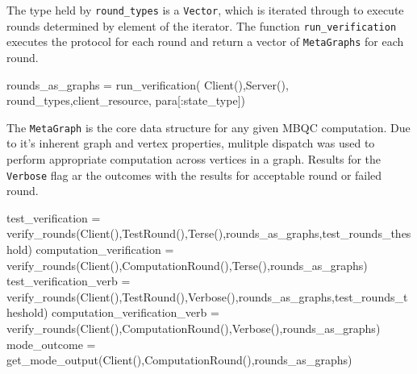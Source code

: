 \documentclass[
]{article}
\newenvironment{Shaded}{}{}
\newcommand{\FunctionTok}[1]{\textcolor[rgb]{0.02,0.16,0.49}{#1}}
\newcommand{\NormalTok}[1]{#1}
\newcommand{\OperatorTok}[1]{\textcolor[rgb]{0.40,0.40,0.40}{#1}}
\begin{document}
The type held by \texttt{round\_types} is a \texttt{Vector}, which is
iterated through to execute rounds determined by element of the
iterator. The function \texttt{run\_verification} executes the protocol
for each round and return a vector of \texttt{MetaGraphs} for each
round.

\begin{Shaded}
\begin{Highlighting}[]
\NormalTok{    rounds\_as\_graphs }\OperatorTok{=} \FunctionTok{run\_verification}\NormalTok{(}
        \FunctionTok{Client}\NormalTok{(),}\FunctionTok{Server}\NormalTok{(),}
\NormalTok{        round\_types,client\_resource,}
\NormalTok{        para[}\OperatorTok{:}\NormalTok{state\_type])}
\end{Highlighting}
\end{Shaded}

The \texttt{MetaGraph} is the core data structure for any given MBQC
computation. Due to it's inherent graph and vertex properties, mulitple
dispatch was used to perform appropriate computation across vertices in
a graph. Results for the \texttt{Verbose} flag ar the outcomes with the
results for acceptable round or failed round.

\begin{Shaded}
\begin{Highlighting}[]
\NormalTok{        test\_verification }\OperatorTok{=} \FunctionTok{verify\_rounds}\NormalTok{(}\FunctionTok{Client}\NormalTok{(),}\FunctionTok{TestRound}\NormalTok{(),}\FunctionTok{Terse}\NormalTok{(),rounds\_as\_graphs,test\_rounds\_theshold)}
\NormalTok{        computation\_verification }\OperatorTok{=} \FunctionTok{verify\_rounds}\NormalTok{(}\FunctionTok{Client}\NormalTok{(),}\FunctionTok{ComputationRound}\NormalTok{(),}\FunctionTok{Terse}\NormalTok{(),rounds\_as\_graphs)}
\NormalTok{        test\_verification\_verb }\OperatorTok{=} \FunctionTok{verify\_rounds}\NormalTok{(}\FunctionTok{Client}\NormalTok{(),}\FunctionTok{TestRound}\NormalTok{(),}\FunctionTok{Verbose}\NormalTok{(),rounds\_as\_graphs,test\_rounds\_theshold)}
\NormalTok{        computation\_verification\_verb }\OperatorTok{=} \FunctionTok{verify\_rounds}\NormalTok{(}\FunctionTok{Client}\NormalTok{(),}\FunctionTok{ComputationRound}\NormalTok{(),}\FunctionTok{Verbose}\NormalTok{(),rounds\_as\_graphs)}
\NormalTok{        mode\_outcome }\OperatorTok{=} \FunctionTok{get\_mode\_output}\NormalTok{(}\FunctionTok{Client}\NormalTok{(),}\FunctionTok{ComputationRound}\NormalTok{(),rounds\_as\_graphs)}
\end{Highlighting}
\end{Shaded}
\end{document}
